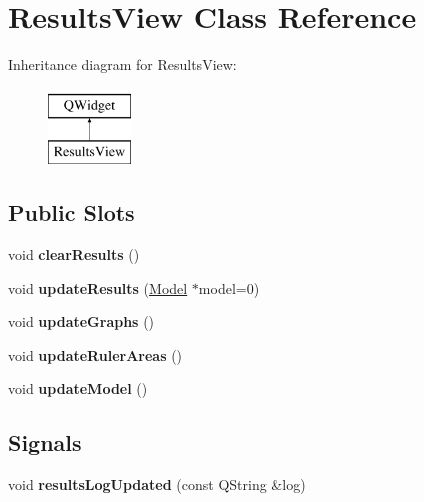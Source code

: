 \hypertarget{class_results_view}{\section{Results\-View Class Reference}
\label{class_results_view}
}
Inheritance diagram for Results\-View\-:\begin{figure}[H]
\begin{center}
\leavevmode
\includegraphics[height=2.000000cm]{class_results_view}
\end{center}
\end{figure}
\subsection*{Public Slots}
\begin{DoxyCompactItemize}
\item 
\hypertarget{class_results_view_a17e31e7a169eca8c6a1353581d35d8b5}{void {\bfseries clear\-Results} ()}\label{class_results_view_a17e31e7a169eca8c6a1353581d35d8b5}

\item 
\hypertarget{class_results_view_a3c58baa38bc66bca2fe66e700d4cf894}{void {\bfseries update\-Results} (\hyperlink{class_model}{Model} $\ast$model=0)}\label{class_results_view_a3c58baa38bc66bca2fe66e700d4cf894}

\item 
\hypertarget{class_results_view_a02753fa801d7d8d81ff2dc091e3b30bc}{void {\bfseries update\-Graphs} ()}\label{class_results_view_a02753fa801d7d8d81ff2dc091e3b30bc}

\item 
\hypertarget{class_results_view_a99e78421fdd70f5cc39c2944d2bd0f2a}{void {\bfseries update\-Ruler\-Areas} ()}\label{class_results_view_a99e78421fdd70f5cc39c2944d2bd0f2a}

\item 
\hypertarget{class_results_view_af8ae5b09bb21c43e37d3f8315ebf5f34}{void {\bfseries update\-Model} ()}\label{class_results_view_af8ae5b09bb21c43e37d3f8315ebf5f34}

\end{DoxyCompactItemize}
\subsection*{Signals}
\begin{DoxyCompactItemize}
\item 
\hypertarget{class_results_view_ac7351c27260c7613c62cc251830ab76e}{void {\bfseries results\-Log\-Updated} (const Q\-String \&log)}\label{class_results_view_ac7351c27260c7613c62cc251830ab76e}

\end{DoxyCompactItemize}
